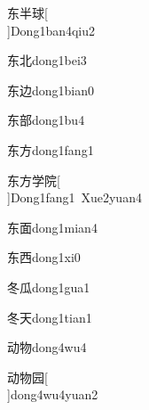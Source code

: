 \begin{verbete}[5;5;11]{东半球}[\\]{Dong1ban4qiu2}
\end{verbete}

\begin{verbete}[5;5]{东北}{dong1bei3}
\end{verbete}

\begin{verbete}[5;5]{东边}{dong1bian0}
\end{verbete}

\begin{verbete}[5;10]{东部}{dong1bu4}
\end{verbete}

\begin{verbete}[5;4]{东方}{dong1fang1}
\end{verbete}

\begin{verbete}[5;4;8;9]{东方学院}[\\]{Dong1fang1\ Xue2yuan4}
\end{verbete}

\begin{verbete}[5;9]{东面}{dong1mian4}
\end{verbete}

\begin{verbete}[5;6]{东西}{dong1xi0}
\end{verbete}

\begin{verbete}[5;5]{冬瓜}{dong1gua1}
\end{verbete}

\begin{verbete}[5;4]{冬天}{dong1tian1}
\end{verbete}

\begin{verbete}[6;8]{动物}{dong4wu4}
\end{verbete}

\begin{verbete}[6;8;7]{动物园}[\\]{dong4wu4yuan2}
\end{verbete}

